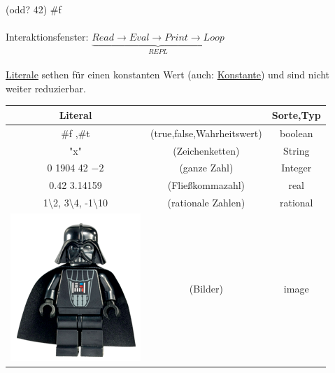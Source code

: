 (odd? 42) \eval \#f\\
\linie\\
Interaktionsfenster:\hspace*{2.5cm} $\underbrace{Read \rightarrow Eval \rightarrow Print \rightarrow Loop}_{REPL}$\\
\linie\\
\underline{Literale} sethen f\"ur einen konstanten Wert (auch: \underline{Konstante}) und sind nicht weiter reduzierbar.\\
\begin{center}
\begin{tabular}{ccc}
Literal &  & Sorte,Typ\\
\hline
\#f ,\#t & (true,false,Wahrheitswert) & boolean\\
"x" & (Zeichenketten) & String\\
0 1904 42 $-2$ & (ganze Zahl) & Integer\\
0.42 3.14159 & (Flie\ss kommazahl) & real\\
1\textbackslash 2, 3\textbackslash 4, -1\textbackslash 10 & (rationale Zahlen) & rational\\
\includegraphics[scale=0.2]{Darth_Vader} & (Bilder) & image

\end{tabular}
\end{center}


